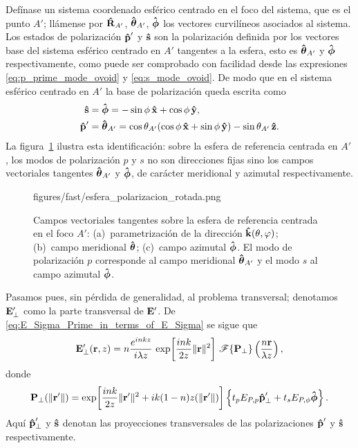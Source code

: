 Defínase un sistema coordenado esférico centrado en el foco del sistema, que es el punto $A'$; llámense por $\bm{\hat{\mathbf{R}}}_{A'}$, $\bm{\hat{\mathbf{\theta}}}_{A'}$, $\bm{\hat{\mathbf{\phi}}}$ los vectores curvilíneos asociados al sistema. Los estados de polarización $\bm{\hat{\mathbf{p}}}'$ y $\bm{\hat{\mathbf{s}}}$ son la polarización definida por los vectores base del sistema esférico centrado en $A'$ tangentes a la esfera, esto es $\bm{\hat{\mathbf{\theta}}}_{A'}$ y $\bm{\hat{\mathbf{\phi}}}$ respectivamente, como puede ser comprobado con facilidad desde las expresiones \eqref{eq:p_prime_mode_ovoid} y \eqref{eq:s_mode_ovoid}. De modo que en el sistema esférico centrado en $A'$ la base de polarización queda escrita como
\begin{align}
\bm{\hat{\mathbf{s}}}
&=
\bm{\hat{\mathbf{\phi}}}
=
-\sin\phi\,\bm{\hat{\mathbf{x}}}
+
\cos\phi\,\bm{\hat{\mathbf{y}}},
\\
\bm{\hat{\mathbf{p}}}'
&=
\bm{\hat{\mathbf{\theta}}}_{A'}
=
\cos\theta_{A'}
(\cos\phi\,\bm{\hat{\mathbf{x}}}+\sin\phi\,\bm{\hat{\mathbf{y}}})
-
\sin\theta_{A'}\,\bm{\hat{\mathbf{z}}}.
\label{s_p_in_A_prime_system}
\end{align}
La figura~\ref{fig:sphere_theta_phi_fields} ilustra esta identificación: sobre la esfera de referencia centrada en $A'$, los modos de polarización $p$ y $s$ no son direcciones fijas sino los campos vectoriales tangentes $\bm{\hat{\mathbf{\theta}}}_{A'}$ y $\bm{\hat{\mathbf{\phi}}}$, de carácter meridional y azimutal respectivamente.

\begin{figure}[H]
  \centering
    {figures/fast/esfera_polarizacion_rotada.png}
  \caption{Campos vectoriales tangentes sobre la esfera de referencia centrada en el foco $A'$: (a)~parametrización de la dirección $\bm{\hat{\mathbf{k}}}(\theta,\varphi)$; (b)~campo meridional $\bm{\hat{\mathbf{\theta}}}$; (c)~campo azimutal $\bm{\hat{\mathbf{\phi}}}$. El modo de polarización $p$ corresponde al campo meridional $\bm{\hat{\mathbf{\theta}}}_{A'}$ y el modo $s$ al campo azimutal $\bm{\hat{\mathbf{\phi}}}$.}
  \label{fig:sphere_theta_phi_fields}
\end{figure}

Pasamos pues, sin pérdida de generalidad, al problema transversal; denotamos $\vb E'_\perp$ como la parte transversal de $\vb E'$. De \eqref{eq:E_Sigma_Prime_in_terms_of_E_Sigma} se sigue que
\begin{equation}
\vb{E}'_\perp(\vb r,z)
=
n\frac{e^{inkz}}{i\lambda z}\,
\exp\!\left[
\frac{ink}{2z}\|\vb r\|^2
\right]
\,
\mathscr F\{\vb P_\perp\}
\left(
\frac{n\vb r}{\lambda z}
\right),
\label{eq:E_field_as_FT}
\end{equation}
donde
\begin{equation}
\vb P_\perp(\|\vb r'\|)
=
\exp\!\left[
\frac{ink}{2z}\|\vb r'\|^2
+
ik(1-n)z(\|\vb r'\|)
\right]
\left\{
t_p E_{P,p} \bm{\hat{\mathbf{p}}}'_\perp
+
t_s E_{P,\phi} \bm{\hat{\mathbf{\phi}}}
\right\}.
\end{equation}
Aquí $\bm{\hat{\mathbf{p}}}'_\perp$ y $\bm{\hat{\mathbf{s}}}$ denotan las proyecciones transversales de las polarizaciones $\bm{\hat{\mathbf{p}}}'$ y $\bm{\hat{\mathbf{s}}}$ respectivamente.

